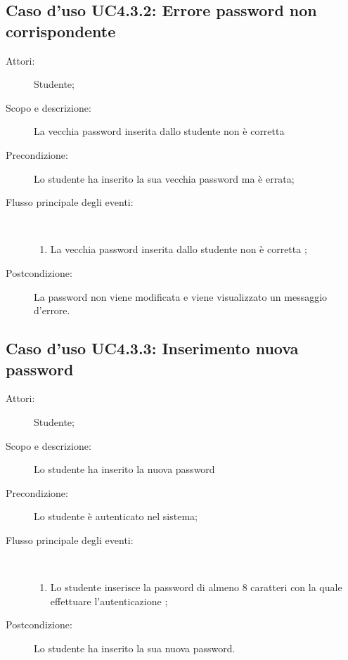 \subsection{Caso d'uso UC4.3.2: Errore password non corrispondente}\begin{description}
	\item[Attori:] Studente;
	\item[Scopo e descrizione:] La vecchia password inserita dallo studente non è corretta
	\item[Precondizione:] Lo studente ha inserito la sua vecchia password ma è errata;
	
	\item[Flusso principale degli eventi:] \ 
	\begin{enumerate}
		\item La vecchia password inserita dallo studente non è corretta
		;
		
	\end{enumerate}
	\item[Postcondizione:] La password non viene modificata e viene visualizzato un messaggio d'errore.
\end{description}
\hypertarget{UC4.3.3}{}
\subsection{Caso d'uso UC4.3.3: Inserimento nuova password}\begin{description}
	\item[Attori:] Studente;
	\item[Scopo e descrizione:] Lo studente ha inserito la nuova password
	\item[Precondizione:] Lo studente è autenticato nel sistema;
	
	\item[Flusso principale degli eventi:] \ 
	\begin{enumerate}
		\item Lo studente inserisce la password di almeno 8 caratteri con la quale effettuare l'autenticazione	;
		
	\end{enumerate}
	\item[Postcondizione:] Lo studente ha inserito la sua nuova password.
\end{description}
\hypertarget{UC4.4}{}
